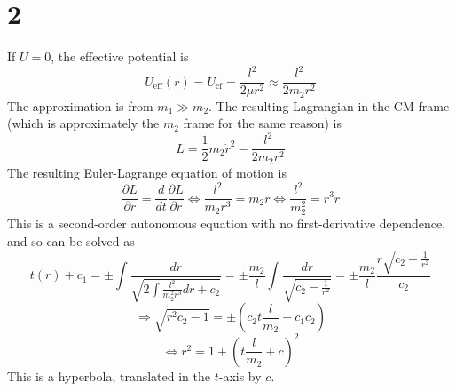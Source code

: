 \documentclass{article}
\begin{document}
\section*{2}
If $U=0$, the effective potential is
\[U_{\textrm{eff}}(r)=U_{\textrm{cf}}=\frac{l^2}{2\mu r^2}\approx \frac{l^2}{2m_2 r^2}\]
The approximation is from $m_1\gg m_2$. The resulting Lagrangian in the CM frame (which is approximately the $m_2$ frame for the same reason) is
\[L=\frac{1}{2}m_2\dot{r}^2-\frac{l^2}{2m_2 r^2}\]
The resulting Euler-Lagrange equation of motion is
\[\frac{\partial L}{\partial r}=\frac{d}{dt}\frac{\partial L}{\partial \dot{r}}\Leftrightarrow \frac{l^2}{m_2 r^3}=m_2\ddot{r}\Leftrightarrow \frac{l^2}{m_2^2}=r^3\ddot{r}\]
This is a second-order autonomous equation with no first-derivative dependence, and so can be solved as
\[t(r)+c_1=\pm\int\frac{dr}{\sqrt{2\int\frac{l^2}{m_2^2 r^3}dr+c_2}}=\pm{\frac{m_2}{l}}\int\frac{dr}{\sqrt{c_2-\frac{1}{r^2}}}=\pm{\frac{m_2}{l}}\frac{r\sqrt{c_2-\frac{1}{r^2}}}{c_2}\]
\[\Rightarrow \sqrt{r^2c_2-{1}}=\pm\left(c_2t{\frac{l}{m_2}}+c_1c_2\right)\]
\[\Leftrightarrow r^2={1+\left( t{\frac{l}{m_2}}+c \right)^2}\]
This is a hyperbola, translated in the $t$-axis by $c$.
\end{document}
